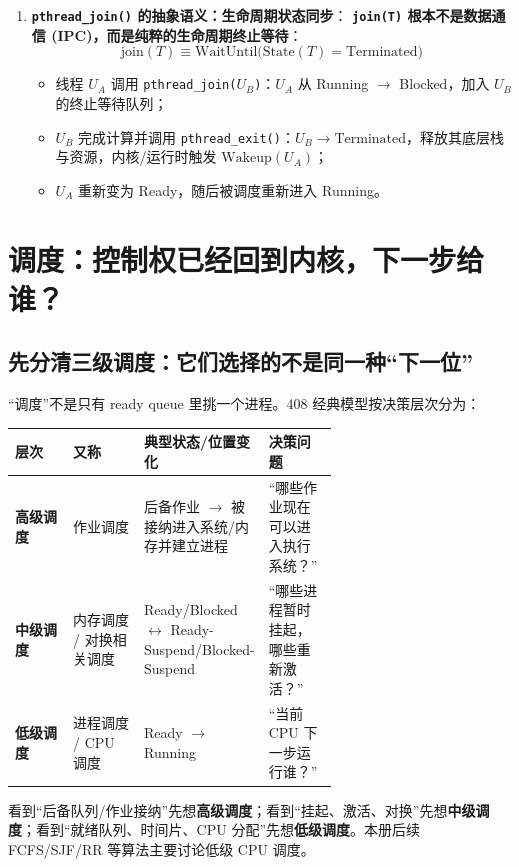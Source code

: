 \documentclass[11pt,a4paper]{ctexart}
\newcommand{\kw}[1]{\textbf{#1}}
\newcommand{\code}[1]{\texttt{#1}}
\begin{document}
\begin{enumerate}
\item \kw{\code{pthread\_join()} 的抽象语义：生命周期状态同步}：
  \kw{\code{join(T)} 根本不是数据通信 (IPC)，而是纯粹的生命周期终止等待}：
  \[
  \boxed{\text{join}(T) \equiv \text{WaitUntil}\big(\text{State}(T) = \text{Terminated}\big)}
  \]
  \begin{itemize}
    \item 线程 $U_A$ 调用 \code{pthread\_join($U_B$)}：$U_A$ 从 Running $\to$ Blocked，加入 $U_B$ 的终止等待队列；
    \item $U_B$ 完成计算并调用 \code{pthread\_exit()}：$U_B \to \text{Terminated}$，释放其底层栈与资源，内核/运行时触发 $\text{Wakeup}(U_A)$；
    \item $U_A$ 重新变为 Ready，随后被调度重新进入 Running。
  \end{itemize}
\end{enumerate}

\section{调度：控制权已经回到内核，下一步给谁？}

\subsection{先分清三级调度：它们选择的不是同一种“下一位”}

“调度”不是只有 ready queue 里挑一个进程。408 经典模型按决策层次分为：

\begingroup
\small
\renewcommand{\arraystretch}{1.25}
\setlength{\tabcolsep}{5pt}
\begin{tabularx}{\linewidth}{>{\bfseries}p{0.18\linewidth} p{0.22\linewidth} p{0.24\linewidth} X}
\toprule
层次 & 又称 & 典型状态/位置变化 & 决策问题\\
\midrule
高级调度 & 作业调度 & 后备作业 $\to$ 被接纳进入系统/内存并建立进程 & “哪些作业现在可以进入执行系统？”\\
中级调度 & 内存调度 / 对换相关调度 & Ready/Blocked $\leftrightarrow$ Ready-Suspend/Blocked-Suspend & “哪些进程暂时挂起，哪些重新激活？”\\
低级调度 & 进程调度 / CPU 调度 & Ready $\to$ Running & “当前 CPU 下一步运行谁？”\\
\bottomrule
\end{tabularx}
\endgroup

\begin{corebox}[一眼定位]
看到“后备队列/作业接纳”先想\kw{高级调度}；看到“挂起、激活、对换”先想\kw{中级调度}；看到“就绪队列、时间片、CPU 分配”先想\kw{低级调度}。本册后续 FCFS/SJF/RR 等算法主要讨论低级 CPU 调度。
\end{corebox}
\end{document}
